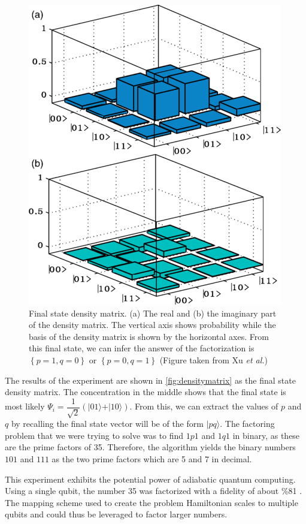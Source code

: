 \documentclass[%
 reprint,
 amsmath,amssymb,
 aps,
]{revtex4-1}
\begin{document}
	\begin{figure}
	\includegraphics[scale=0.49]{Fig3XuEtAl}
	\caption{	
		Final state density matrix. (a) The real and (b) the imaginary part of the density matrix. The vertical axis shows probability while the basis of the density matrix is shown by the horizontal axes. From this final state, we can infer the answer of the factorization is $\left\lbrace p=1, q=0 \right\rbrace$ or $\left\lbrace p=0, q=1 \right\rbrace$ (Figure taken from Xu \textit{et al.}\cite{Xu2017})
	}	
	\end{figure}
	\label{fig:densitymatrix}
	
	The results of the experiment are shown in \ref{fig:densitymatrix} as the final state density matrix. The concentration in the middle shows that the final state is most likely $\Psi_i = \dfrac{1}{\sqrt{2}}\left(\vert 01 \rangle + \vert 10 \rangle   \right)$. From this, we can extract the values of $p$ and $q$ by recalling the final state vector will be of the form $\vert pq \rangle$. The factoring problem that we were trying to solve was to find $1p1$ and $1q1$ in binary, as these are the prime factors of 35. Therefore, the algorithm yields the binary numbers $101$ and $111$ as the two prime factors which are 5 and 7 in decimal.
	
	This experiment exhibits the potential power of adiabatic quantum computing. Using a single qubit, the number 35 was factorized with a fidelity of about \%81 \cite{Xu2017}. The mapping scheme used to create the problem Hamiltonian scales to multiple qubits and could thus be leveraged to factor larger numbers.
	
\end{document}
